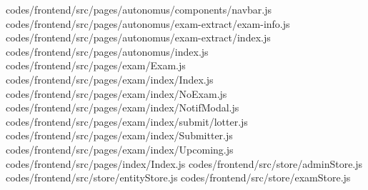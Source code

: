 codes/frontend/src/pages/autonomus/components/navbar.js
codes/frontend/src/pages/autonomus/exam-extract/exam-info.js
codes/frontend/src/pages/autonomus/exam-extract/index.js
codes/frontend/src/pages/autonomus/index.js
codes/frontend/src/pages/exam/Exam.js
codes/frontend/src/pages/exam/index/Index.js
codes/frontend/src/pages/exam/index/NoExam.js
codes/frontend/src/pages/exam/index/NotifModal.js
codes/frontend/src/pages/exam/index/submit/lotter.js
codes/frontend/src/pages/exam/index/Submitter.js
codes/frontend/src/pages/exam/index/Upcoming.js
codes/frontend/src/pages/index/Index.js
codes/frontend/src/store/adminStore.js
codes/frontend/src/store/entityStore.js
codes/frontend/src/store/examStore.js
